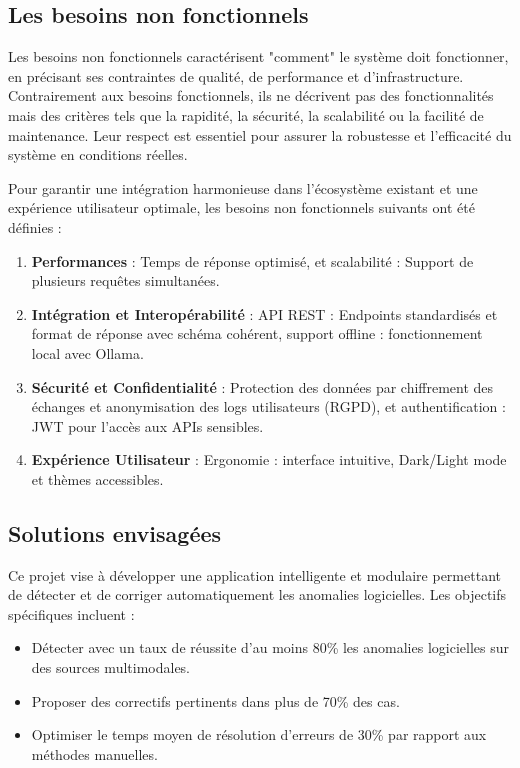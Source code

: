 \documentclass[12pt,a4paper]{report}
\begin{document}
	\subsection{Les besoins non fonctionnels}
	
	Les besoins non fonctionnels caractérisent "comment" le système doit fonctionner, en précisant ses contraintes de qualité, de performance et d’infrastructure. Contrairement aux besoins fonctionnels, ils ne décrivent pas des fonctionnalités mais des critères tels que la rapidité, la sécurité, la scalabilité ou la facilité de maintenance. Leur respect est essentiel pour assurer la robustesse et l’efficacité du système en conditions réelles.
	
	Pour garantir une intégration harmonieuse dans l’écosystème existant et une expérience utilisateur optimale, les besoins non fonctionnels suivants ont été définies :
	
	\begin{enumerate}
		
		\item \textbf{Performances} : Temps de réponse optimisé, et scalabilité : Support de plusieurs requêtes simultanées.
		
		\item \textbf{Intégration et Interopérabilité} : API REST : Endpoints standardisés et format de réponse avec schéma cohérent, support offline : fonctionnement local avec Ollama.
		
		\item \textbf{Sécurité et Confidentialité} : Protection des données par chiffrement des échanges et anonymisation des logs utilisateurs (RGPD), et authentification : JWT pour l’accès aux APIs sensibles.	
		
		\item \textbf{Expérience Utilisateur} : Ergonomie : interface intuitive, Dark/Light mode et thèmes accessibles.

		
	\end{enumerate}
	
	\subsection{Solutions envisagées}
	
	Ce projet vise à développer une application intelligente et modulaire permettant de détecter et de corriger automatiquement les anomalies logicielles. Les objectifs spécifiques incluent :
	
	\renewcommand{\labelitemi}{$\bullet$}
	\begin{itemize}
		\item Détecter avec un taux de réussite d'au moins 80\% les anomalies logicielles sur des sources multimodales.
		
		\item Proposer des correctifs pertinents dans plus de 70\% des cas.
		
		\item Optimiser le temps moyen de résolution d’erreurs de 30\% par rapport aux méthodes manuelles.
	\end{itemize}
	
\end{document}
